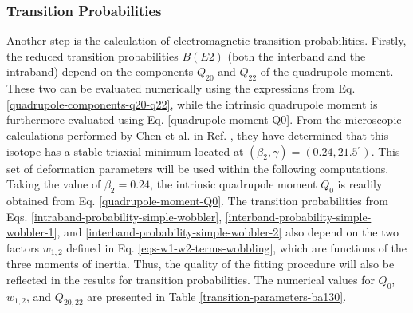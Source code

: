 \subsubsection{Transition Probabilities}

Another step is the calculation of electromagnetic transition probabilities. Firstly, the reduced transition probabilities $B(E2)$ (both the interband and the intraband) depend on the components $Q_{20}$ and $Q_{22}$ of the quadrupole moment. These two can be evaluated numerically using the expressions from Eq. \ref{quadrupole-components-q20-q22}, while the intrinsic quadrupole moment is furthermore evaluated using Eq. \ref{quadrupole-moment-Q0}. From the microscopic calculations performed by Chen et al. in Ref. \cite{chen2019transverse}, they have determined that this isotope has a stable triaxial minimum located at $(\beta_2,\gamma)=(0.24,21.5^\circ)$. This set of deformation parameters will be used within the following computations. Taking the value of $\beta_2=0.24$, the intrinsic quadrupole moment $Q_0$ is readily obtained from Eq. \ref{quadrupole-moment-Q0}. The transition probabilities from Eqs. \ref{intraband-probability-simple-wobbler}, \ref{interband-probability-simple-wobbler-1}, and \ref{interband-probability-simple-wobbler-2} also depend on the two factors $w_{1,2}$ defined in Eq. \ref{eqs-w1-w2-terms-wobbling}, which are functions of the three moments of inertia. Thus, the quality of the fitting procedure will also be reflected in the results for transition probabilities. The numerical values for $Q_0$, $w_{1,2}$, and $Q_{20,22}$ are presented in Table \ref{transition-parameters-ba130}.
